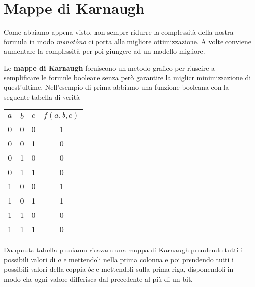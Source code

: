 \section{Mappe di Karnaugh}
Come abbiamo appena visto, non sempre ridurre la complessità della nostra formula in modo
\emph{monotòno} ci porta alla migliore ottimizzazione. A volte conviene aumentare la complessità
per poi giungere ad un modello migliore.

Le \textbf{mappe di Karnaugh} forniscono un metodo grafico per riuscire a semplificare le formule
booleane senza però garantire la miglior minimizzazione di quest'ultime. Nell'esempio di prima
abbiamo una funzione booleana con la seguente tabella di verità
\begin{center}
	\begin{tabular}{c c c | c}
		$a$ & $b$ & $c$ & $f(a,b,c)$ \\ \hline
		0   & 0   & 0   & 1          \\
		0   & 0   & 1   & 0          \\
		0   & 1   & 0   & 0          \\
		0   & 1   & 1   & 0          \\
		1   & 0   & 0   & 1          \\
		1   & 0   & 1   & 1          \\
		1   & 1   & 0   & 0          \\
		1   & 1   & 1   & 0
	\end{tabular}
\end{center}
Da questa tabella possiamo ricavare una mappa di Karnaugh prendendo tutti i possibili valori di $a$
e mettendoli nella prima colonna e poi prendendo tutti i possibili valori della coppia $bc$ e
mettendoli sulla prima riga, disponendoli in modo che ogni valore differisca dal precedente al più
di un bit.

